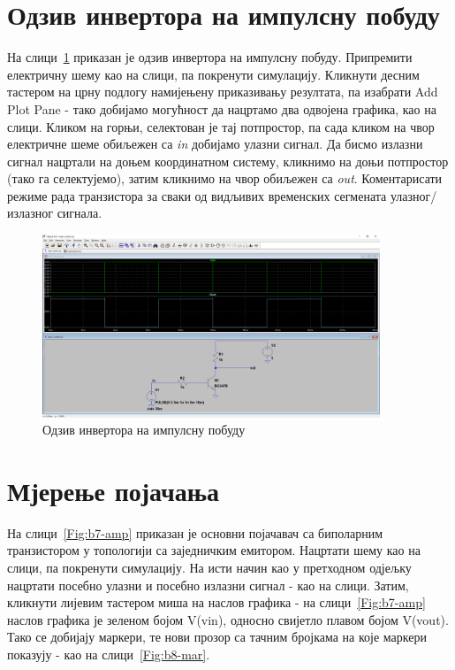 \section{Одзив инвертора на импулсну побуду}

На слици~\ref{Fig:b6-inv} приказан је одзив инвертора на импулсну побуду. Припремити електричну шему као на слици, па покренути симулацију. Кликнути десним тастером на црну подлогу намијењену приказивању резултата, па изабрати Add Plot Pane - тако добијамо могућност да нацртамо два одвојена графика, као на слици. Кликом на горњи, селектован је тај потпростор, па сада кликом на чвор електричне шеме обиљежен са \textit{in} добијамо улазни сигнал. Да бисмо излазни сигнал нацртали на доњем координатном систему, кликнимо на доњи потпростор (тако га селектујемо), затим кликнимо на чвор обиљежен са \textit{out}. Коментарисати режиме рада транзистора за сваки од видљивих временских сегмената улазног/излазног сигнала.

\begin{figure}[h]
\centering
\includegraphics[width=0.9\textwidth]{figs/b6.PNG}
\caption{Одзив инвертора на импулсну побуду}
\label{Fig:b6-inv}
\end{figure}


\section{Мјерење појачања}

На слици~\ref{Fig:b7-amp} приказан је основни појачавач са биполарним транзистором у топологији са заједничким емитором. Нацртати шему као на слици, па покренути симулацију. На исти начин као у претходном одјељку нацртати посебно улазни и посебно излазни сигнал - као на слици. Затим, кликнути лијевим тастером миша на наслов графика - на слици~\ref{Fig:b7-amp} наслов графика је зеленом бојом V(vin), односно свијетло плавом бојом V(vout). Тако се добијају маркери, те нови прозор са тачним бројкама на које маркери показују - као на слици~\ref{Fig:b8-mar}.

